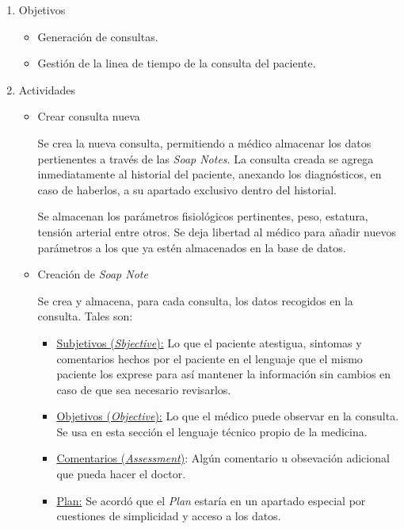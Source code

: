     \begin{enumerate}
        \item Objetivos
        \begin{itemize}
            \item Generación de consultas.
            \item Gestión de la linea de tiempo de la consulta del paciente.
        \end{itemize}
        \item Actividades
        \begin{itemize}
            \item Crear consulta nueva
            
            Se crea la nueva consulta, permitiendo a médico almacenar los datos pertienentes a través de las \textit{Soap Notes}. La consulta creada se agrega inmediatamente al historial del paciente, anexando los diagnósticos, en caso de haberlos, a su apartado exclusivo dentro del historial.
            
            Se almacenan los parámetros fisiológicos pertinentes, peso, estatura, tensión arterial entre otros. Se deja libertad al médico para añadir nuevos parámetros a los que ya estén almacenados en la base de datos.
            
            \item Creación de \textit{Soap Note}
            
            Se crea y almacena, para cada consulta, los datos recogidos en la consulta. Tales son:
            
            \begin{itemize}
                \item \underline{Subjetivos (\textit{Sbjective}):} Lo que el paciente atestigua, sintomas y comentarios hechos por el paciente en el lenguaje que el mismo paciente los exprese para así mantener la información sin cambios en caso de que sea necesario revisarlos.
                \item \underline{Objetivos (\textit{Objective}):} Lo que el médico puede observar en la consulta. Se usa en esta sección el lenguaje técnico propio de la medicina.
                \item \underline{Comentarios (\textit{Assessment})}: Algún comentario u obsevación adicional que pueda hacer el doctor.
                \item \underline{Plan:} Se acordó que el \textit{Plan} estaría en un apartado especial por cuestiones de simplicidad y acceso a los datos.
            \end{itemize}
            

\end{itemize}
\end{enumerate}
